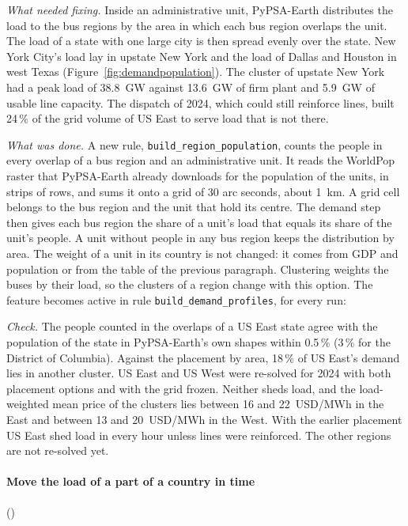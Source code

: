 \textit{What needed fixing.}
Inside an administrative unit, PyPSA-Earth distributes the load to the bus regions by the area in which each bus region overlaps the unit.
The load of a state with one large city is then spread evenly over the state.
New York City's load lay in upstate New York and the load of Dallas and Houston in west Texas (Figure~\ref{fig:demandpopulation}).
The cluster of upstate New York had a peak load of \SI{38.8}{GW} against \SI{13.6}{GW} of firm plant and \SI{5.9}{GW} of usable line capacity.
The dispatch of 2024, which could still reinforce lines, built 24\,\% of the grid volume of US East to serve load that is not there.

\textit{What was done.}
A new rule, \texttt{build\_region\_population}, counts the people in every overlap of a bus region and an administrative unit.
It reads the WorldPop raster that PyPSA-Earth already downloads for the population of the units, in strips of rows, and sums it onto a grid of 30 arc seconds, about \SI{1}{km}.
A grid cell belongs to the bus region and the unit that hold its centre.
The demand step then gives each bus region the share of a unit's load that equals its share of the unit's people.
A unit without people in any bus region keeps the distribution by area.
The weight of a unit in its country is not changed: it comes from GDP and population or from the table of the previous paragraph.
Clustering weights the buses by their load, so the clusters of a region change with this option.
The feature becomes active in rule \texttt{build\_demand\_profiles}, for every run:

\textit{Check.}
The people counted in the overlaps of a US East state agree with the population of the state in PyPSA-Earth's own shapes within 0.5\,\% (3\,\% for the District of Columbia).
Against the placement by area, 18\,\% of US East's demand lies in another cluster.
US East and US West were re-solved for 2024 with both placement options and with the grid frozen.
Neither sheds load, and the load-weighted mean price of the clusters lies between 16 and \SI{22}{USD/MWh} in the East and between 13 and \SI{20}{USD/MWh} in the West.
With the earlier placement US East shed load in every hour unless lines were reinforced.
The other regions are not re-solved yet.

\paragraph{Move the load of a part of a country in time} ()


